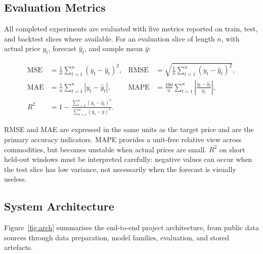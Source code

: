 \documentclass[12pt,a4paper]{article}
\begin{document}
\subsection{Evaluation Metrics}\label{sec:metrics}

All completed experiments are evaluated with five metrics reported on train, test, and backtest slices where available. For an evaluation slice of length $n$, with actual price $y_t$, forecast $\hat{y}_t$, and sample mean $\bar{y}$:

\begin{align}
\mathrm{MSE}  &= \frac{1}{n}\sum_{t=1}^{n}(y_t-\hat{y}_t)^2, &
\mathrm{RMSE} &= \sqrt{\frac{1}{n}\sum_{t=1}^{n}(y_t-\hat{y}_t)^2}, \nonumber\\
\mathrm{MAE}  &= \frac{1}{n}\sum_{t=1}^{n}|y_t-\hat{y}_t|, &
\mathrm{MAPE} &= \frac{100}{n}\sum_{t=1}^{n}\left|\frac{y_t-\hat{y}_t}{y_t}\right|, \label{eq:metrics}\\
R^2 &= 1-\frac{\sum_{t=1}^{n}(y_t-\hat{y}_t)^2}{\sum_{t=1}^{n}(y_t-\bar{y})^2}. \nonumber
\end{align}

RMSE and MAE are expressed in the same units as the target price and are the primary accuracy indicators. MAPE provides a unit-free relative view across commodities, but becomes unstable when actual prices are small. $R^2$ on short held-out windows must be interpreted carefully: negative values can occur when the test slice has low variance, not necessarily when the forecast is visually useless.

\subsection{System Architecture}

Figure~\ref{fig:arch} summarises the end-to-end project architecture, from public data sources through data preparation, model families, evaluation, and stored artefacts.
\end{document}
